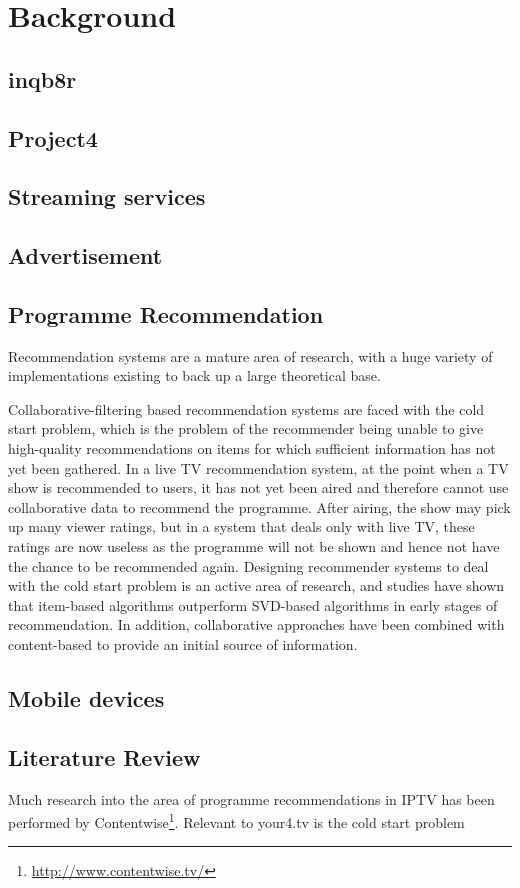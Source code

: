 \section{Background}

	\subsection{inqb8r}

	\subsection{Project4}

	\subsection{Streaming services}

	\subsection{Advertisement}

	\subsection{Programme Recommendation}

	Recommendation systems are a mature area of research, with a huge variety of implementations existing to back up a large theoretical base. 


	Collaborative-filtering based recommendation systems are faced with the cold start problem, which is the problem of the recommender being unable to give high-quality recommendations on items for which sufficient information has not yet been gathered. In a live TV recommendation system, at the point when a TV show is recommended to users, it has not yet been aired and therefore cannot use collaborative data to recommend the programme. After airing, the show may pick up many viewer ratings, but in a system that deals only with live TV, these ratings are now useless as the programme will not be shown and hence not have the chance to be recommended again. Designing recommender systems to deal with the cold start problem is an active area of research, and studies have shown that item-based algorithms outperform SVD-based algorithms in early stages of recommendation\cite{cold-start-problem}. In addition, collaborative approaches have been combined with content-based to provide an initial source of information\cite{generative_models}.

	\subsection{Mobile devices}

	\subsection{Literature Review}
		Much research into the area of programme recommendations in IPTV has been performed by Contentwise\footnote{\url{http://www.contentwise.tv/}}. Relevant to your4.tv is the cold start problem
